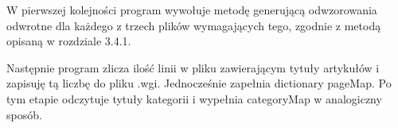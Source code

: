 W pierwszej kolejności program wywołuje metodę generującą odwzorowania odwrotne dla każdego z trzech plików wymagających tego, zgodnie z metodą opisaną w rozdziale 3.4.1.

Następnie program zlicza ilość linii w pliku zawierającym tytuły artykułów i zapisuję tą liczbę do pliku .wgi. Jednocześnie zapełnia dictionary pageMap. Po tym etapie odczytuje tytuły kategorii i wypełnia categoryMap w analogiczny sposób.